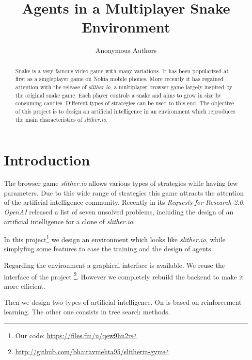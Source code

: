 \documentclass[journal, a4paper]{IEEEtran}
\begin{document}
\title{Agents in a Multiplayer Snake Environment}
\author{Anonymous Authors}
\maketitle

\begin{abstract}
Snake is a very famous video game with many variations. It has been popularized at first as a singleplayer game on Nokia mobile phones. More recently it has regained attention with the release of \emph{slither.io}, a multiplayer browser game largely inspired by the original snake game. Each player controls a snake and aims to grow in size by consuming candies. Different types of strategies can be used to this end. The objective of this project is to design an artificial intelligence in an environment which reproduces the main characteristics of \emph{slither.io}.

\end{abstract}

\section{Introduction}
The browser game \emph{slither.io} allows various types of strategies while having few parameters. Due to this wide range of strategies this game attracts the attention of the artificial intelligence community. Recently in its \emph{Requests for Research 2.0}, \emph{OpenAI} released a list of seven unsolved problems, including the design of an artificial intelligence for a clone of \emph{slither.io}.

In this project\footnote{Our code: \url{https://files.fm/u/qew9hn2r}}
we design an environment which looks like \emph{slither.io}, while simplyfing some features to ease the training and the design of agents. 

Regarding the environment a graphical interface is available. We reuse the interface of the project 
\footnote{\url{http://github.com/bhairavmehta95/slitherin-gym}}. However we completely rebuild the backend to make it more efficient. 

Then we design two types of artificial intelligence. On is based on reinforcement learning. The other one consists in tree search methods.
\end{document}
